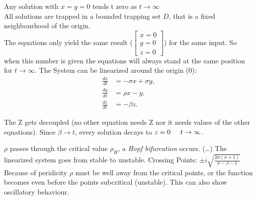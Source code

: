 \documentclass[12pt,a4paper]{article}
\newcommand{\dert}[1]{\frac{d#1}{dt}}
\begin{document}
	Any solution with \( x = y = 0 \) tends t zero as \( t \rightarrow \infty \)\\
	All solutions are trapped in a bounded trapping set \( D \), that is a fixed neighbourhood of the origin.\\
	The equations only yield the same result (\( \begin{bmatrix}x=0\\y=0\\z=0\end{bmatrix} \)) for the same input. So when this number is given the equations will always stand at the same position for  \( t \rightarrow \infty \).
	The System can be linearized around the origin (0):
	\begin{subequations}
		\label{Lorenz-Equations}
		\begin{align}
			\dert{x} &= -\sigma x + \sigma y,\\
			\dert{y} &= \rho x - y,\\
			\dert{z} &= -\beta z.
		\end{align}
	\end{subequations}

	The Z gets decoupled (no other equation needs Z nor it needs values of the other equations). Since \( \beta \rightarrow t\), every solution decays to \( z = 0 \hspace{5mm} t \rightarrow \infty \).

	\( \rho \) passes through the critical value \( \rho_H\), a \textit{Hopf bifurcation} occurs. (\ldots) The linearized system goes from stable to unstable. Crossing Points: \( \pm i\sqrt{\frac{2\sigma(\sigma + 1)}{\sigma - \beta - 1}} \) Because of peridicity \( \rho \) must be well away from the critical points, or the function becomes even before the points subcritical (unstable). This can also show oscillatory behaviour.
\end{document}
